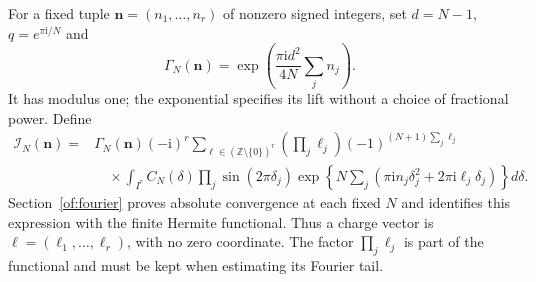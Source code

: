 \documentclass[11pt]{article}
\numberwithin{equation}{section}
\theoremstyle{definition}\newtheorem{definition}[theorem]{Definition}
\theoremstyle{remark}\newtheorem{remark}[theorem]{Remark}
\newcommand{\ii}{\mathrm i}
\begin{document}
For a fixed tuple $\boldsymbol n=(n_1,\ldots,n_r)$ of nonzero signed
integers, set $d=N-1$, $q=e^{\pi\ii/N}$ and
\begin{equation}\label{of:scalar}
 \Gamma_N(\boldsymbol n)
   =\exp\left(\frac{\pi\ii d^2}{4N}\sum_j n_j\right).
\end{equation}
It has modulus one; the exponential specifies its lift without a
choice of fractional power. Define
\begin{equation}\label{of:period}
\begin{split}
 \mathcal I_N(\boldsymbol n)
 ={}&\Gamma_N(\boldsymbol n)(-\ii)^r
 \sum_{\ell\in(\mathbb Z\setminus\{0\})^r}
       \left(\prod_j\ell_j\right)(-1)^{(N+1)\sum_j\ell_j}\\
 &\quad\times\int_{I^r}C_N(\delta)
       \prod_j\sin(2\pi\delta_j)
       \exp\left\{N\sum_j
          (\pi\ii n_j\delta_j^2+2\pi\ii\ell_j\delta_j)\right\}
                       d\delta.
\end{split}
\end{equation}
Section~\ref{of:fourier} proves absolute convergence at each fixed
$N$ and identifies this expression with the finite Hermite functional.
Thus a charge vector is $\ell=(\ell_1,\ldots,\ell_r)$, with
no zero coordinate. The factor $\prod_j\ell_j$ is part of the
functional and must be kept when estimating its Fourier tail.
\end{document}
